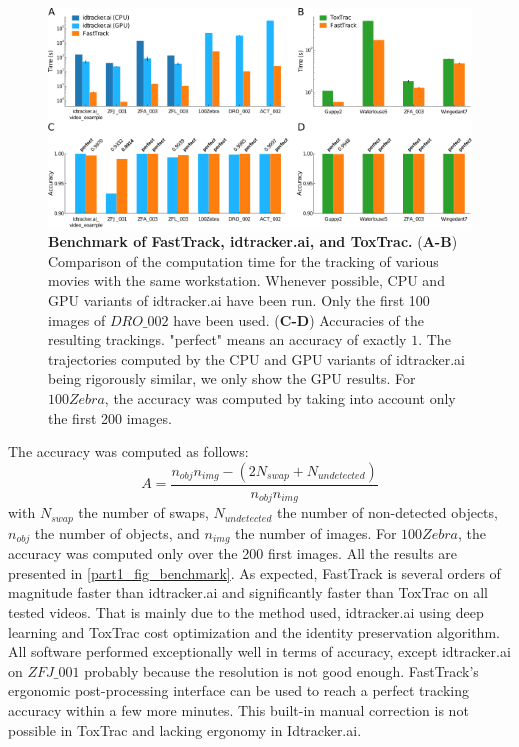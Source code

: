 	\begin{figure}[h!]
    \centering
    \includegraphics[width=\textwidth]{part_1/assets/Figure_benchmark.png}
    \caption{{\bf Benchmark of FastTrack, idtracker.ai, and ToxTrac.}
        (\textbf{A-B}) Comparison of the computation time for the tracking of various movies with the same workstation. Whenever possible, CPU and GPU variants of idtracker.ai have been run. Only the first 100 images of $DRO\_002$ have been used.
        (\textbf{C-D}) Accuracies of the resulting trackings. "perfect" means an accuracy of exactly $1$. The trajectories computed by the CPU and GPU variants of idtracker.ai being rigorously similar, we only show the GPU results. For $100Zebra$, the accuracy was computed by taking into account only the first 200 images.}
    \label{part_1:fig_benchmark}
    \end{figure}

    The accuracy was computed as follows:
    $$ A=\frac{n_{obj}n_{img} - (2N_{swap} + N_{undetected})}{n_{obj}n_{img}}$$
    with $N_{swap}$ the number of swaps, $N_{undetected}$ the number of non-detected objects, $n_{obj}$ the number of objects, and $n_{img}$ the number of images.
    For $100Zebra$, the accuracy was computed only over the 200 first images. All the results are presented in \ref{part1_fig_benchmark}. As expected, FastTrack is several orders of magnitude faster than idtracker.ai and significantly faster than ToxTrac on all tested videos. That is mainly due to the method used, idtracker.ai using deep learning and ToxTrac cost optimization and the identity preservation algorithm.
    All software performed exceptionally well in terms of accuracy, except idtracker.ai on $ZFJ\_001$ probably because the resolution is not good enough.
    FastTrack's ergonomic post-processing interface can be used to reach a perfect tracking accuracy within a few more minutes. This built-in manual correction is not possible in ToxTrac and lacking ergonomy in Idtracker.ai.

